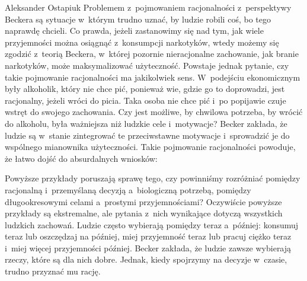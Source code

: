 \begin{artplenv}{Aleksander Ostapiuk}
Problemem z~pojmowaniem racjonalności z~perspektywy Beckera są sytuacje w~którym trudno uznać, by ludzie robili coś, bo
tego naprawdę chcieli. Co prawda, jeżeli zastanowimy się nad tym, jak wiele przyjemności można osiągnąć z~konsumpcji
narkotyków, wtedy możemy się zgodzić z~teorią Beckera, w~której pozornie nieracjonalne zachowanie, jak branie
narkotyków, może maksymalizować użyteczność. Powstaje jednak pytanie, czy takie pojmowanie racjonalności ma jakikolwiek
sens. W~podejściu ekonomicznym były alkoholik, który nie chce pić, ponieważ wie, gdzie go to doprowadzi, jest
racjonalny, jeżeli wróci do picia. Taka osoba nie chce pić i~po popijawie czuje wstręt do swojego zachowania. Czy
jest możliwe, by chwilowa potrzeba, by wrócić do alkoholu, była ważniejsza niż ludzkie cele i~motywacje? Becker
zakłada, że ludzie są w~stanie zintegrować te przeciwstawne motywacje i~sprowadzić je do wspólnego mianownika
użyteczności. Takie pojmowanie racjonalności powoduje, że łatwo dojść do absurdalnych wniosków: 


Powyższe przykłady poruszają sprawę tego, czy powinniśmy rozróżniać pomiędzy racjonalną i~przemyślaną
decyzją a~biologiczną potrzebą, pomiędzy długookresowymi celami a~prostymi przyjemnościami? Oczywiście powyższe przykłady są
ekstremalne, ale pytania z~nich wynikające dotyczą wszystkich ludzkich zachowań. Ludzie często wybierają pomiędzy teraz
a~później: konsumuj teraz lub oszczędzaj na później, miej przyjemność teraz lub pracuj ciężko teraz i~miej więcej
przyjemności później. Becker zakłada, że ludzie zawsze wybierają rzeczy, które są dla nich dobre. Jednak, kiedy
spojrzymy na decyzje w~czasie, trudno przyznać mu rację. 


\end{artplenv}
